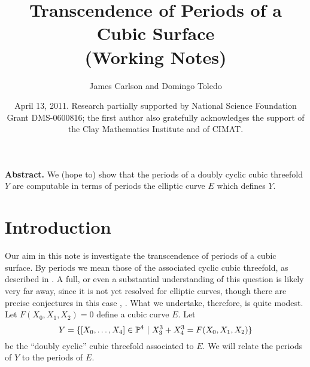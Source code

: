 \documentclass[11pt]{amsart}
\title{Transcendence of Periods of a Cubic Surface \\ (Working Notes)}
\author{James Carlson and Domingo Toledo }
\date{April 13, 2011. Research partially supported by National Science
Foundation Grant DMS-0600816;
 the first author also gratefully acknowledges the support of the Clay
 Mathematics Institute and of CIMAT.  \\
 }
\begin{document}
\maketitle

{\bf Abstract.} We (hope to) show that the periods of a doubly cyclic
cubic threefold $Y$ are computable in terms of periods the elliptic curve
$E$ which defines $Y$.


\parskip=1pt
\tableofcontents


\parskip=5pt

\section{Introduction}

Our aim in this note is investigate the transcendence of periods
of a cubic surface.  By periods we mean those of the associated
cyclic cubic threefold, as described in \cite{ACT}. A full, or
even a substantial understanding of this question is likely very
far away, since it is not yet resolved for elliptic curves,
though there are precise conjectures in this case \cite{Andre},
\cite{Waldschmitt}.  What we undertake, therefore, is quite modest.
Let $F(X_0,X_1,X_2) = 0$ define a cubic curve $E$.  Let
\[
   Y = \{[X_0, \ldots, X_4] \in {\mathbb P}^4\ |\ X_3^3 + X_4^3 = F(X_0,X_1,X_2)\}
\]
be the ``doubly cyclic'' cubic threefold associated to $E$.  We will relate
the periods of $Y$ to the periods of $E$.
\end{document}
